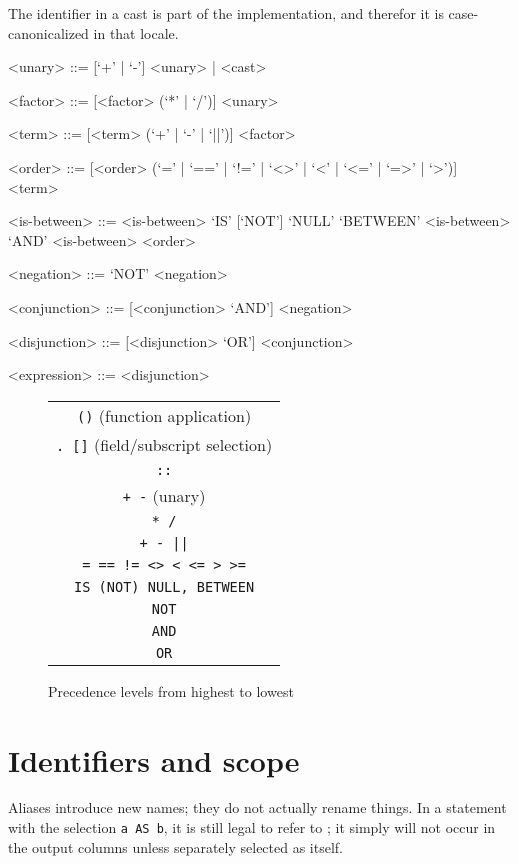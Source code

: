 \documentclass{article}
\begin{document}
The identifier in a cast is part of the \SoQL{} implementation, and
therefor it is case-canonicalized in that locale.

\begin{grammar}
<unary> ::= [`+' | `-'] <unary> | <cast>

<factor> ::= [<factor> (`*' | `/')] <unary>

<term> ::= [<term> (`+' | `-' | `||')] <factor>

<order> ::= [<order> (`=' | `==' | `!=' | `<>' | `<' | `<=' | `=>' | `>')] <term>

<is-between> ::= <is-between> `IS' [`NOT'] `NULL'
  `BETWEEN' <is-between> `AND' <is-between>
 \alt <order>

<negation> ::= `NOT' <negation>

<conjunction> ::= [<conjunction> `AND'] <negation>

<disjunction> ::= [<disjunction> `OR'] <conjunction>

<expression> ::= <disjunction>
\end{grammar}

\begin{figure}
\begin{center}
\begin{tabular}{c}
\lstinline|()| (function application) \\
\lstinline|. []| (field/subscript selection) \\
\lstinline|::| \\
\lstinline|+ -| (unary) \\
\lstinline|* /| \\
\lstinline!+ - ||! \\
\lstinline|= == != <> < <= > >=| \\
\lstinline|IS (NOT) NULL, BETWEEN| \\
\lstinline|NOT| \\
\lstinline|AND| \\
\lstinline|OR| \\
\end{tabular}
\end{center}
\caption{Precedence levels from highest to lowest}
\label{precedence}
\end{figure}

\section{Identifiers and scope}

Aliases introduce new names; they do not actually rename things.  In a
statement with the selection \lstinline|a AS b|, it is still legal to
refer to ; it simply will not occur in the output columns
unless separately selected as itself.
\end{document}
